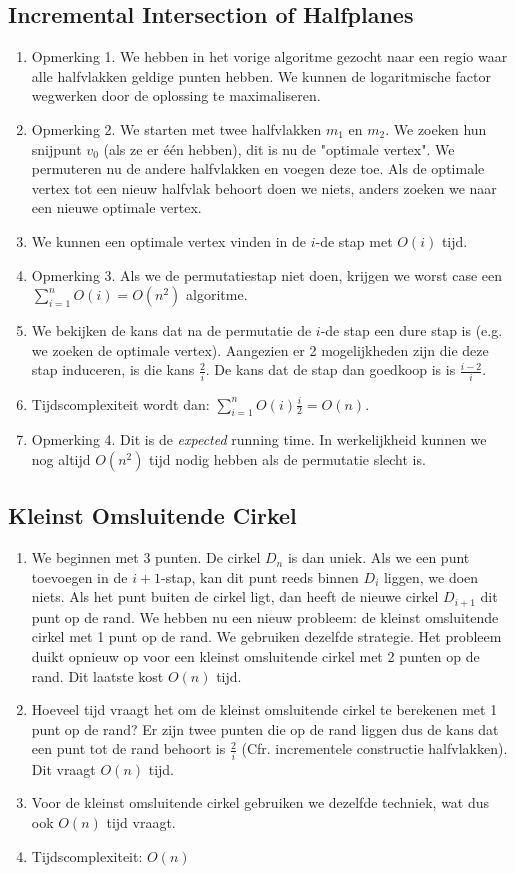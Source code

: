 \documentclass[12pt,a4paper]{article}
\begin{document}
		\subsection{Incremental Intersection of Halfplanes}
			\begin{enumerate}
				\item Opmerking 1. We hebben in het vorige algoritme gezocht naar een regio waar alle halfvlakken geldige punten hebben. We kunnen de logaritmische factor wegwerken door de oplossing te maximaliseren.
				\item Opmerking 2. We starten met twee halfvlakken $m_1$ en $m_2$. We zoeken hun snijpunt $v_0$ (als ze er één hebben), dit is nu de "optimale vertex". We permuteren nu de andere halfvlakken en voegen deze toe. Als de optimale vertex tot een nieuw halfvlak behoort doen we niets, anders zoeken we naar een nieuwe optimale vertex.
				\item We kunnen een optimale vertex vinden in de $i$-de stap met $O(i)$ tijd. 
				\item Opmerking 3. Als we de permutatiestap niet doen, krijgen we worst case een $\sum_{i=1}^{n}O(i) = O(n^2)$ algoritme.
				\item We bekijken de kans dat na de permutatie de $i$-de stap een dure stap is (e.g. we zoeken de optimale vertex). Aangezien er 2 mogelijkheden zijn die deze stap induceren, is die kans $\frac{2}{i}$. De kans dat de stap dan goedkoop is is $\frac{i - 2}{i}$. 
				\item Tijdscomplexiteit wordt dan: $\sum_{i=1}^{n}O(i)\frac{i}{2} = O(n)$. 
				\item Opmerking 4. Dit is de \emph{expected} running time. In werkelijkheid kunnen we nog altijd $O(n^2)$ tijd nodig hebben als de permutatie slecht is.
			\end{enumerate}
			
		\subsection{Kleinst Omsluitende Cirkel}
			\begin{enumerate}
				\item We beginnen met 3 punten. De cirkel $D_n$ is dan uniek. Als we een punt toevoegen in de $i + 1$-stap, kan dit punt reeds binnen $D_i$ liggen, we doen niets. Als het punt buiten de cirkel ligt, dan heeft de nieuwe cirkel $D_{i+1}$ dit punt op de rand. We hebben nu een nieuw probleem: de kleinst omsluitende cirkel met 1 punt op de rand. We gebruiken dezelfde strategie. Het probleem duikt opnieuw op voor een kleinst omsluitende cirkel met 2 punten op de rand. Dit laatste kost $O(n)$ tijd.
				\item Hoeveel tijd vraagt het om de kleinst omsluitende cirkel te berekenen met 1 punt op de rand? Er zijn twee punten die op de rand liggen dus de kans dat een punt tot de rand behoort is $\frac{2}{i}$ (Cfr. incrementele constructie halfvlakken). Dit vraagt $O(n)$ tijd. 
				\item Voor de kleinst omsluitende cirkel gebruiken we dezelfde techniek, wat dus ook $O(n)$ tijd vraagt. 
				\item Tijdscomplexiteit: $O(n)$
			\end{enumerate}
\end{document}
